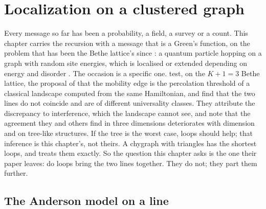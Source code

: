 \chapter{Localization on a clustered graph}
\label{ch:localization}


Every message so far has been a probability, a field, a survey or a count.
This chapter carries the recursion with a message that is a Green's
function, on the problem that has been the Bethe lattice's since
\citet{abouchacra1973}: a quantum particle hopping on a graph with random
site energies, which is localised or extended depending on energy and
disorder \citep{anderson1958}. The occasion is a specific one.
\citet{tonetti2026} test, on the $K+1=3$ Bethe lattice, the proposal of
\citet{filoche2012} that the mobility edge is the percolation threshold of
a classical landscape computed from the same Hamiltonian, and find that the
two lines do not coincide and are of different universality classes. They
attribute the discrepancy to interference, which the landscape cannot see,
and note that the agreement they and others find in three dimensions
deteriorates with dimension and on tree-like structures. If the tree is
the worst case, loops should help; that inference is this chapter's, not
theirs. A chygraph with
triangles has the shortest loops, and treats them exactly. So the question
this chapter asks is the one their paper leaves: do loops bring the two
lines together. They do not; they part them further.

\section{The Anderson model on a line}
\label{sec:line}


